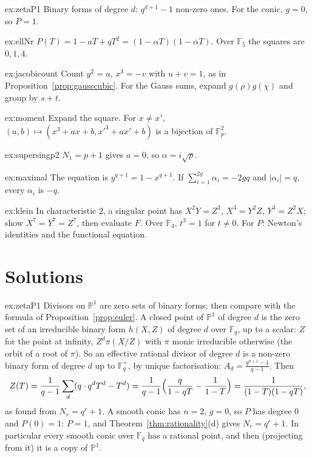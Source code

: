 \begin{hint}{ex:zetaP1}
Binary forms of degree $d$: $q^{d+1}-1$ non-zero ones. For the conic, $g=0$, so $P=1$.
\end{hint}
\begin{hint}{ex:ellNr}
$P(T)=1-aT+qT^2=(1-\alpha T)(1-\overline\alpha T)$. Over $\mathbb F_5$ the squares are $0,1,4$.
\end{hint}
\begin{hint}{ex:jacobicount}
Count $y^2=u$, $x^3=-v$ with $u+v=1$, as in Proposition~\ref{prop:gausscubic}. For the Gauss sums, expand $g(\rho)g(\chi)$ and group by $s+t$.
\end{hint}
\begin{hint}{ex:moment}
Expand the square. For $x\ne x'$, $(a,b)\mapsto(x^3+ax+b,x'^3+ax'+b)$ is a bijection of $\mathbb F_p^2$.
\end{hint}
\begin{hint}{ex:supersingp2}
$N_1=p+1$ gives $a=0$, so $\alpha=i\sqrt p$.
\end{hint}
\begin{hint}{ex:maximal}
The equation is $y^{q+1}=1-x^{q+1}$. If $\sum_{i=1}^{2g}\alpha_i=-2gq$ and $|\alpha_i|=q$, every $\alpha_i$ is $-q$.
\end{hint}
\begin{hint}{ex:klein}
In characteristic $2$, a singular point has $X^2Y=Z^3$, $X^3=Y^2Z$, $Y^3=Z^2X$; show $X^7=Y^7=Z^7$, then evaluate $F$. Over $\mathbb F_4$, $t^3=1$ for $t\ne0$.
For $P$: Newton's identities and the functional equation.
\end{hint}

\section{Solutions}

\begin{solution}{ex:zetaP1}
\idea Divisors on $\mathbb P^1$ are zero sets of binary forms; then compare with the formula of Proposition~\ref{prop:euler}.
\writeup A closed point of $\mathbb P^1$ of degree $d$ is the zero set of an irreducible binary form $h(X,Z)$ of degree $d$ over $\mathbb F_q$, up to a scalar:
$Z$ for the point at infinity, $Z^d\pi(X/Z)$ with $\pi$ monic irreducible otherwise (the orbit of a root of $\pi$). So an effective rational divisor of degree $d$ is a
non-zero binary form of degree $d$ up to $\mathbb F_q^\times$, by unique factorisation: $A_d=\frac{q^{d+1}-1}{q-1}$. Then
\[
Z(T)=\frac1{q-1}\sum_d(q\cdot q^dT^d-T^d)=\frac1{q-1}\Bigl(\frac q{1-qT}-\frac1{1-T}\Bigr)=\frac1{(1-T)(1-qT)},
\]
as found from $N_r=q^r+1$. A smooth conic has $n=2$, $g=0$, so $P$ has degree $0$ and $P(0)=1$: $P=1$, and Theorem~\ref{thm:rationality}(d) gives
$N_r=q^r+1$. In particular every smooth conic over $\mathbb F_q$ has a rational point, and then (projecting from it) it is a copy of $\mathbb P^1$.
\end{solution}

